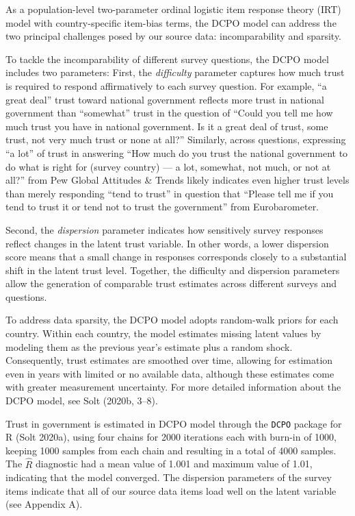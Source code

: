 \documentclass[
  12pt,
]{article}
\begin{document}
As a population-level two-parameter ordinal logistic item response theory (IRT) model with country-specific item-bias terms, the DCPO model can address the two principal challenges posed by our source data: incomparability and sparsity.

To tackle the incomparability of different survey questions, the DCPO model includes two parameters:
First, the \emph{difficulty} parameter captures how much trust is required to respond affirmatively to each survey question.
For example, ``a great deal'' trust toward national government reflects more trust in national government than ``somewhat'' trust in the question of ``Could you tell me how much trust you have in national government. Is it a great deal of trust, some trust, not very much trust or none at all?''
Similarly, across questions, expressing ``a lot'' of trust in answering ``How much do you trust the national government to do what is right for (survey country) --- a lot, somewhat, not much, or not at all?'' from Pew Global Attitudes \& Trends likely indicates even higher trust levels than merely responding ``tend to trust'' in question that ``Please tell me if you tend to trust it or tend not to trust the government'' from Eurobarometer.

Second, the \emph{dispersion} parameter indicates how sensitively survey responses reflect changes in the latent trust variable.
In other words, a lower dispersion score means that a small change in responses corresponds closely to a substantial shift in the latent trust level.
Together, the difficulty and dispersion parameters allow the generation of comparable trust estimates across different surveys and questions.

To address data sparsity, the DCPO model adopts random-walk priors for each country.
Within each country, the model estimates missing latent values by modeling them as the previous year's estimate plus a random shock.
Consequently, trust estimates are smoothed over time, allowing for estimation even in years with limited or no available data, although these estimates come with greater measurement uncertainty.
For more detailed information about the DCPO model, see Solt (2020b, 3--8).

Trust in government is estimated in DCPO model through the \texttt{DCPO} package for R (Solt 2020a), using four chains for 2000 iterations each with burn-in of 1000, keeping 1000 samples from each chain and resulting in a total of 4000 samples.
The \(\hat{R}\) diagnostic had a mean value of 1.001 and maximum value of 1.01, indicating that the model converged.
The dispersion parameters of the survey items indicate that all of our source data items load well on the latent variable (see Appendix A).
\end{document}
